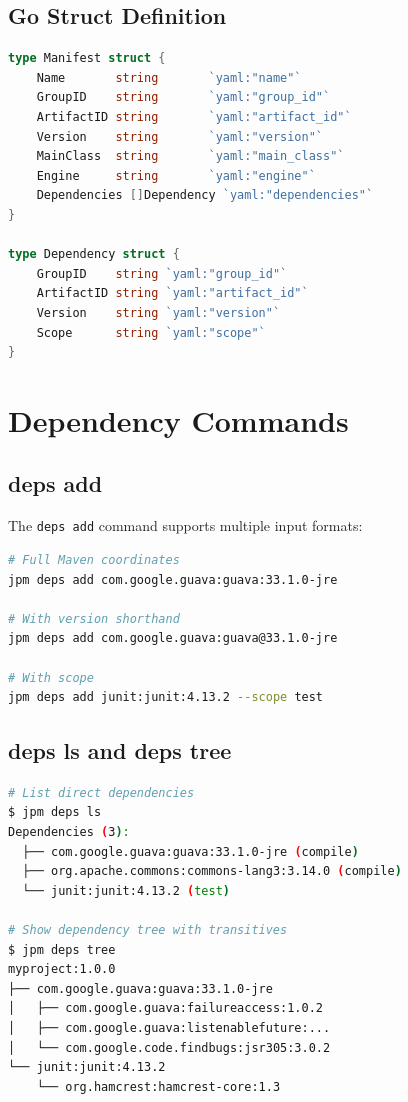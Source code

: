 \documentclass[12pt,a4paper]{report}
\begin{document}
\subsection{Go Struct Definition}

\begin{lstlisting}[language=Go, caption=Manifest Model]
type Manifest struct {
    Name       string       `yaml:"name"`
    GroupID    string       `yaml:"group_id"`
    ArtifactID string       `yaml:"artifact_id"`
    Version    string       `yaml:"version"`
    MainClass  string       `yaml:"main_class"`
    Engine     string       `yaml:"engine"`
    Dependencies []Dependency `yaml:"dependencies"`
}

type Dependency struct {
    GroupID    string `yaml:"group_id"`
    ArtifactID string `yaml:"artifact_id"`
    Version    string `yaml:"version"`
    Scope      string `yaml:"scope"`
}
\end{lstlisting}

\section{Dependency Commands}

\subsection{deps add}

The \texttt{deps add} command supports multiple input formats:

\begin{lstlisting}[language=bash, caption=Dependency Addition Formats]
# Full Maven coordinates
jpm deps add com.google.guava:guava:33.1.0-jre

# With version shorthand
jpm deps add com.google.guava:guava@33.1.0-jre

# With scope
jpm deps add junit:junit:4.13.2 --scope test
\end{lstlisting}

\subsection{deps ls and deps tree}

\begin{lstlisting}[language=bash, caption=Dependency Listing Commands]
# List direct dependencies
$ jpm deps ls
Dependencies (3):
  ├── com.google.guava:guava:33.1.0-jre (compile)
  ├── org.apache.commons:commons-lang3:3.14.0 (compile)
  └── junit:junit:4.13.2 (test)

# Show dependency tree with transitives
$ jpm deps tree
myproject:1.0.0
├── com.google.guava:guava:33.1.0-jre
│   ├── com.google.guava:failureaccess:1.0.2
│   ├── com.google.guava:listenablefuture:...
│   └── com.google.code.findbugs:jsr305:3.0.2
└── junit:junit:4.13.2
    └── org.hamcrest:hamcrest-core:1.3
\end{lstlisting}
\end{document}
